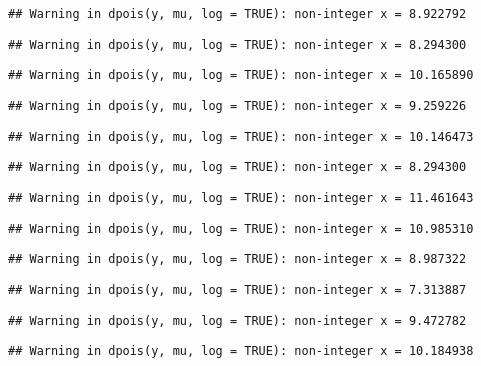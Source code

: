 \documentclass[
]{article}
\begin{document}
\begin{verbatim}
## Warning in dpois(y, mu, log = TRUE): non-integer x = 8.922792
\end{verbatim}

\begin{verbatim}
## Warning in dpois(y, mu, log = TRUE): non-integer x = 8.294300
\end{verbatim}

\begin{verbatim}
## Warning in dpois(y, mu, log = TRUE): non-integer x = 10.165890
\end{verbatim}

\begin{verbatim}
## Warning in dpois(y, mu, log = TRUE): non-integer x = 9.259226
\end{verbatim}

\begin{verbatim}
## Warning in dpois(y, mu, log = TRUE): non-integer x = 10.146473
\end{verbatim}

\begin{verbatim}
## Warning in dpois(y, mu, log = TRUE): non-integer x = 8.294300
\end{verbatim}

\begin{verbatim}
## Warning in dpois(y, mu, log = TRUE): non-integer x = 11.461643
\end{verbatim}

\begin{verbatim}
## Warning in dpois(y, mu, log = TRUE): non-integer x = 10.985310
\end{verbatim}

\begin{verbatim}
## Warning in dpois(y, mu, log = TRUE): non-integer x = 8.987322
\end{verbatim}

\begin{verbatim}
## Warning in dpois(y, mu, log = TRUE): non-integer x = 7.313887
\end{verbatim}

\begin{verbatim}
## Warning in dpois(y, mu, log = TRUE): non-integer x = 9.472782
\end{verbatim}

\begin{verbatim}
## Warning in dpois(y, mu, log = TRUE): non-integer x = 10.184938
\end{verbatim}
\end{document}
